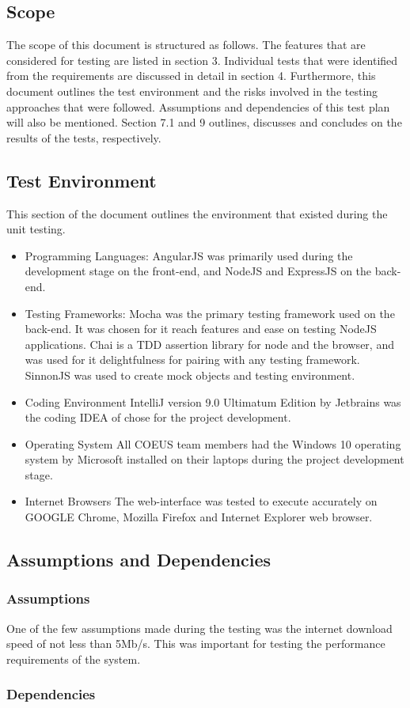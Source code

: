 \subsection{Scope}

The scope of this document is structured as follows. The features that are considered for testing are listed in section 3. Individual tests that were identified from the requirements are
discussed in detail in section 4. Furthermore, this document outlines the test environment
and the risks involved in the testing approaches that were followed. Assumptions and
dependencies of this test plan will also be mentioned. Section 7.1 and 9 outlines,
discusses and concludes on the results of the tests, respectively.


\subsection{Test Environment}

This section of the document outlines the environment that existed during the unit testing.

\begin{itemize}

	\item Programming Languages:
			AngularJS was primarily used during the development 		stage on the front-end, and NodeJS and ExpressJS on the back-end.
	\item Testing Frameworks:
			Mocha was the primary testing framework used on the back-end. It was chosen for it reach features and ease on testing NodeJS applications. Chai is a TDD assertion library for node and the browser, and was used for it delightfulness for pairing with any testing framework. SinnonJS was used to create mock objects and testing environment.
	\item Coding Environment
			IntelliJ version 9.0 Ultimatum Edition by Jetbrains was the coding IDEA of chose for the project development.
	\item Operating System
			All COEUS team members had the Windows 10 operating system by Microsoft installed on their laptops during the project development stage.
	\item Internet Browsers
			The web-interface was tested to execute accurately on GOOGLE Chrome, Mozilla Firefox and Internet Explorer web browser. 
	
\end{itemize}



\subsection{Assumptions and Dependencies}
\subsubsection{Assumptions}
One of the few assumptions made during the testing was the internet download speed of not less than 5Mb/s. This was important for testing the performance requirements of the system.

\subsubsection{Dependencies}



